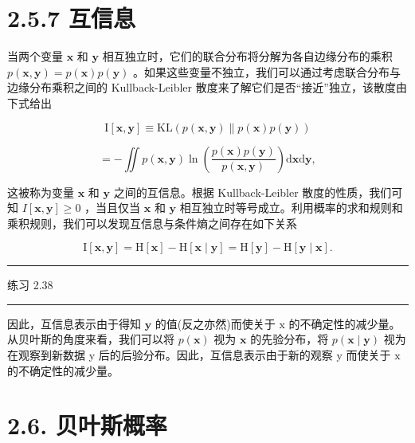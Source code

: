 \documentclass[10pt]{report}
\newcommand{\HRule}{\begin{center}\rule{0.9\linewidth}{0.2mm}\end{center}}
\begin{document}
\section*{2.5.7 互信息}

当两个变量 \(\mathbf{x}\) 和 \(\mathbf{y}\) 相互独立时，它们的联合分布将分解为各自边缘分布的乘积 \(p\left( {\mathbf{x},\mathbf{y}}\right)  = p\left( \mathbf{x}\right) p\left( \mathbf{y}\right)\) 。如果这些变量不独立，我们可以通过考虑联合分布与边缘分布乘积之间的 Kullback-Leibler 散度来了解它们是否“接近”独立，该散度由下式给出

\[
\mathrm{I}\left\lbrack  {\mathbf{x},\mathbf{y}}\right\rbrack   \equiv  \mathrm{{KL}}\left( {p\left( {\mathbf{x},\mathbf{y}}\right) \parallel p\left( \mathbf{x}\right) p\left( \mathbf{y}\right) }\right)
\]

\[
=  - \iint p\left( {\mathbf{x},\mathbf{y}}\right) \ln \left( \frac{p\left( \mathbf{x}\right) p\left( \mathbf{y}\right) }{p\left( {\mathbf{x},\mathbf{y}}\right) }\right) \mathrm{d}\mathbf{x}\mathrm{d}\mathbf{y}, \tag{2.109}
\]

这被称为变量 \(\mathbf{x}\) 和 \(\mathbf{y}\) 之间的互信息。根据 Kullback-Leibler 散度的性质，我们可知 \(I\left\lbrack  {\mathbf{x},\mathbf{y}}\right\rbrack   \geq  0\) ，当且仅当 \(\mathbf{x}\) 和 \(\mathbf{y}\) 相互独立时等号成立。利用概率的求和规则和乘积规则，我们可以发现互信息与条件熵之间存在如下关系

\[
\mathrm{I}\left\lbrack  {\mathbf{x},\mathbf{y}}\right\rbrack   = \mathrm{H}\left\lbrack  \mathbf{x}\right\rbrack   - \mathrm{H}\left\lbrack  {\mathbf{x} \mid  \mathbf{y}}\right\rbrack   = \mathrm{H}\left\lbrack  \mathbf{y}\right\rbrack   - \mathrm{H}\left\lbrack  {\mathbf{y} \mid  \mathbf{x}}\right\rbrack  . \tag{2.110}
\]

\HRule

练习 2.38

\HRule

因此，互信息表示由于得知 \(\mathbf{y}\) 的值(反之亦然)而使关于 \(\mathrm{x}\) 的不确定性的减少量。从贝叶斯的角度来看，我们可以将 \(p\left( \mathbf{x}\right)\) 视为 \(\mathbf{x}\) 的先验分布，将 \(p\left( {\mathbf{x} \mid  \mathbf{y}}\right)\) 视为在观察到新数据 y 后的后验分布。因此，互信息表示由于新的观察 \(\mathrm{y}\) 而使关于 \(\mathrm{x}\) 的不确定性的减少量。

\section*{2.6. 贝叶斯概率}
\end{document}
